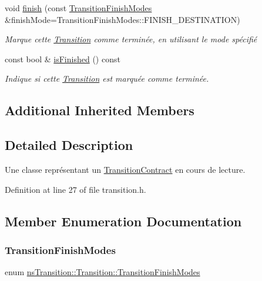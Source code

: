 \begin{DoxyCompactItemize}
void \hyperlink{classns_transition_1_1_transition_a8c8c7caf7326e24ffa540093ed12f581}{finish} (const \hyperlink{classns_transition_1_1_transition_a0bf761e331527477ce0c5e496b722a19}{Transition\+Finish\+Modes} \&finish\+Mode=Transition\+Finish\+Modes\+::\+F\+I\+N\+I\+S\+H\+\_\+\+D\+E\+S\+T\+I\+N\+A\+T\+I\+ON)
\begin{DoxyCompactList}\small\item\em Marque cette \hyperlink{classns_transition_1_1_transition}{Transition} comme terminée, en utilisant le mode spécifié \end{DoxyCompactList}\item 
const bool \& \hyperlink{classns_transition_1_1_transition_ad9d358bee54825d2a8bf83e9e21e398b}{is\+Finished} () const
\begin{DoxyCompactList}\small\item\em Indique si cette \hyperlink{classns_transition_1_1_transition}{Transition} est marquée comme terminée. \end{DoxyCompactList}\end{DoxyCompactItemize}
\subsection*{Additional Inherited Members}


\subsection{Detailed Description}
Une classe représentant un \hyperlink{classns_transition_1_1_transition_contract}{Transition\+Contract} en cours de lecture. 

Definition at line 27 of file transition.\+h.



\subsection{Member Enumeration Documentation}
\mbox{\label{classns_transition_1_1_transition_a0bf761e331527477ce0c5e496b722a19}} 
\subsubsection{\texorpdfstring{Transition\+Finish\+Modes}{TransitionFinishModes}}
{\footnotesize\ttfamily enum \hyperlink{classns_transition_1_1_transition_a0bf761e331527477ce0c5e496b722a19}{ns\+Transition\+::\+Transition\+::\+Transition\+Finish\+Modes}}



